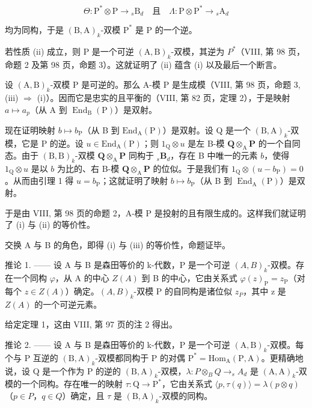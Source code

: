 \[
\Theta : \mathrm{P} ^ {*} \otimes \mathrm{P} \to {} _ {s} \mathrm{B} _ {d} \quad \text{且} \quad \Lambda : \mathrm{P} \otimes \mathrm{P} ^ {*} \to {} _ {s} \mathrm{A} _ {d}
\]

均为同构，于是 \((\mathrm{B},\mathrm{A})_k\)-双模 \(\mathrm{P}^*\) 是 \(\mathrm{P}\) 的一个逆。

若性质 (ii) 成立，则 P 是一个可逆 \((\mathrm{A},\mathrm{B})_{k}\)-双模，其逆为 \(P^{*}\)（VIII, 第 98 页，命题 2 及第 98 页，命题 3）。这就证明了 (ii) 蕴含 (i) 以及最后一个断言。

设 \((\mathrm{A},\mathrm{B})_{k}\)-双模 P 是可逆的。那么 A-模 P 是生成模（VIII, 第 98 页，命题 3, (iii) \(\Rightarrow\) (i)）。因而它是忠实的且平衡的（VIII, 第 82 页，定理 2），于是映射 \(a \mapsto a_{p}\)（从 A 到 \(\operatorname{End}_{\mathrm{B}}(\mathrm{P})\)）是双射。

现在证明映射 \(b \mapsto b_{\mathrm{P}}\)（从 B 到 \(\mathrm{End}_{\mathrm{A}}(\mathrm{P})\)）是双射。设 Q 是一个 \((\mathrm{B},\mathrm{A})_k\)-双模，它是 P 的逆。设 \(u \in \mathrm{End}_{\mathrm{A}}(\mathrm{P})\)；则 \(1_{\mathrm{Q}} \otimes u\) 是左 B-模 \(\mathbf{Q} \otimes_{\mathrm{A}} \mathbf{P}\) 的一个自同态。由于 \((\mathrm{B},\mathrm{B})_k\)-双模 \(\mathbf{Q} \otimes_{\mathrm{A}} \mathbf{P}\) 同构于 \({}_s\mathbf{B}_d\)，存在 B 中唯一的元素 \(b\)，使得 \(1_{\mathrm{Q}} \otimes u\) 是以 \(b\) 为比的、右 B-模 \(\mathbf{Q} \otimes_{\mathrm{A}} \mathbf{P}\) 的位似。于是我们有 \(1_{\mathrm{Q}} \otimes (u - b_{\mathrm{P}}) = 0\)。从而由引理 1 得 \(u = b_{\mathrm{P}}\)；这就证明了映射 \(b \mapsto b_{\mathrm{P}}\)（从 B 到 \(\operatorname{End}_{\mathrm{A}}(\mathrm{P})\)）是双射。

于是由 VIII, 第 98 页的命题 2，A-模 P 是投射的且有限生成的。这样我们就证明了 (i) 与 (ii) 的等价性。

交换 A 与 B 的角色，即得 (i) 与 (iii) 的等价性，命题证毕。

推论 1. —— 设 A 与 B 是森田等价的 k-代数，P 是一个可逆 \((A,B)_{k}\)-双模。存在一个同构 \(\varphi\)，从 A 的中心 \(Z(A)\) 到 B 的中心，它由关系式 \(\varphi(z)_{\mathrm{P}} = z_{\mathrm{P}}\)（对每个 \(z \in Z(A)\)）确定。\((A,B)_{k}\)-双模 P 的自同构是诸位似 \(z_{P}\)，其中 z 是 \(Z(A)\) 的一个可逆元素。

给定定理 1，这由 VIII, 第 97 页的注 2 得出。

推论 2. —— 设 A 与 B 是森田等价的 k-代数，P 是一个可逆 \((\mathrm{A},\mathrm{B})_{k}\)-双模。每个与 P 互逆的 \((\mathrm{B},\mathrm{A})_{k}\)-双模都同构于 P 的对偶 \(\mathrm{P}^{*}=\mathrm{Hom}_{\mathrm{A}}(\mathrm{P},\mathrm{A})\)。更精确地说，设 Q 是一个作为 P 的逆的 \((\mathrm{B},\mathrm{A})_{k}\)-双模，\(\lambda:P\otimes_{B}Q\to_{s}A_{d}\) 是 \((\mathrm{A},\mathrm{A})_{k}\)-双模的一个同构。存在唯一的映射 \(\tau:\mathrm{Q}\to\mathrm{P}^{*}\)，它由关系式 \(\langle p,\tau(q)\rangle=\lambda(p\otimes q)\)（\(p\in P\)，\(q\in Q\)）确定，且 \(\tau\) 是 \((\mathrm{B},\mathrm{A})_{k}\)-双模的同构。

